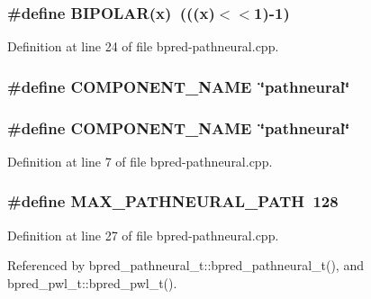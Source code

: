 \subsubsection[{BIPOLAR}]{\setlength{\rightskip}{0pt plus 5cm}\#define BIPOLAR(x)~(((x)$<$$<$1)-1)}\label{bpred-pathneural_8cpp_d1289ccac63a964f638d03575fed7697}




Definition at line 24 of file bpred-pathneural.cpp.
\subsubsection[{COMPONENT\_\-NAME}]{\setlength{\rightskip}{0pt plus 5cm}\#define COMPONENT\_\-NAME~\char`\"{}pathneural\char`\"{}}\label{zesto-bpred_8cpp_9146ade7ce24e3db226a973a59063892}


\subsubsection[{COMPONENT\_\-NAME}]{\setlength{\rightskip}{0pt plus 5cm}\#define COMPONENT\_\-NAME~\char`\"{}pathneural\char`\"{}}\label{bpred-pathneural_8cpp_9146ade7ce24e3db226a973a59063892}




Definition at line 7 of file bpred-pathneural.cpp.
\subsubsection[{MAX\_\-PATHNEURAL\_\-PATH}]{\setlength{\rightskip}{0pt plus 5cm}\#define MAX\_\-PATHNEURAL\_\-PATH~128}\label{bpred-pathneural_8cpp_4f7d20fcbe299b54b9716780a4866250}




Definition at line 27 of file bpred-pathneural.cpp.

Referenced by bpred\_\-pathneural\_\-t::bpred\_\-pathneural\_\-t(), and bpred\_\-pwl\_\-t::bpred\_\-pwl\_\-t().